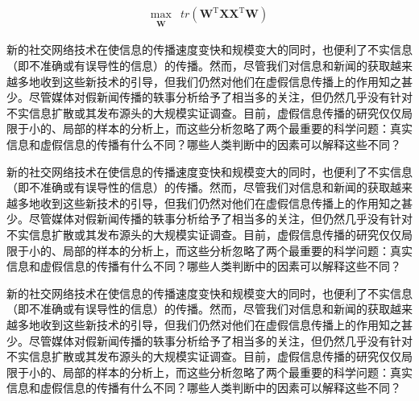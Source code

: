 \documentclass[a4paper,AutoFakeBold,oneside,12pt]{book}
\begin{document}
\begin{equation}
\label{PCA_goal_appx2}
\begin{aligned}
\max_{\substack{\bm{W}}}  &  tr(\bm{W}^\mathrm{T}\bm{X}\bm{X}^ \mathrm{T}\bm{W})
\end{aligned}
\end{equation}

新的社交网络技术在使信息的传播速度变快和规模变大的同时，也便利了不实信息（即不准确或有误导性的信息）的传播。然而，尽管我们对信息和新闻的获取越来越多地收到这些新技术的引导，但我们仍然对他们在虚假信息传播上的作用知之甚少。尽管媒体对假新闻传播的轶事分析给予了相当多的关注，但仍然几乎没有针对不实信息扩散或其发布源头的大规模实证调查。目前，虚假信息传播的研究仅仅局限于小的、局部的样本的分析上，而这些分析忽略了两个最重要的科学问题：真实信息和虚假信息的传播有什么不同？哪些人类判断中的因素可以解释这些不同？

新的社交网络技术在使信息的传播速度变快和规模变大的同时，也便利了不实信息（即不准确或有误导性的信息）的传播。然而，尽管我们对信息和新闻的获取越来越多地收到这些新技术的引导，但我们仍然对他们在虚假信息传播上的作用知之甚少。尽管媒体对假新闻传播的轶事分析给予了相当多的关注，但仍然几乎没有针对不实信息扩散或其发布源头的大规模实证调查。目前，虚假信息传播的研究仅仅局限于小的、局部的样本的分析上，而这些分析忽略了两个最重要的科学问题：真实信息和虚假信息的传播有什么不同？哪些人类判断中的因素可以解释这些不同？

新的社交网络技术在使信息的传播速度变快和规模变大的同时，也便利了不实信息（即不准确或有误导性的信息）的传播。然而，尽管我们对信息和新闻的获取越来越多地收到这些新技术的引导，但我们仍然对他们在虚假信息传播上的作用知之甚少。尽管媒体对假新闻传播的轶事分析给予了相当多的关注，但仍然几乎没有针对不实信息扩散或其发布源头的大规模实证调查。目前，虚假信息传播的研究仅仅局限于小的、局部的样本的分析上，而这些分析忽略了两个最重要的科学问题：真实信息和虚假信息的传播有什么不同？哪些人类判断中的因素可以解释这些不同？

\endgroup

\blankmatter
 


\blankmatter
 
\end{document}
